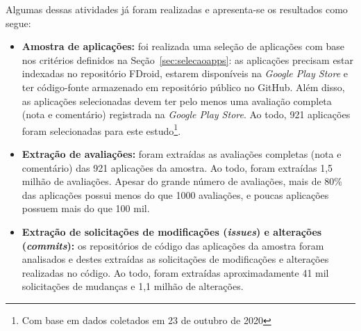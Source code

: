 Algumas dessas atividades já foram realizadas e apresenta-se os resultados como segue:
\begin{itemize}
 \item \textbf{Amostra de aplicações: } foi realizada uma seleção de aplicações com base nos critérios definidos na Seção~\ref{sec:selecaoapps}: as aplicações precisam estar indexadas no repositório FDroid, estarem disponíveis na \textit{Google Play Store} e ter código-fonte armazenado em repositório público no GitHub. Além disso, as aplicações selecionadas devem ter pelo menos uma avaliação completa (nota e comentário) registrada na \textit{Google Play Store}. Ao todo, 921 aplicações foram selecionadas para este estudo\footnote{Com base em dados coletados em 23 de outubro de 2020}.
 
 \item \textbf{Extração de avaliações: } foram extraídas as avaliações completas (nota e comentário) das 921 aplicações da amostra. Ao todo, foram extraídas 1,5 milhão de avaliações. Apesar do grande número de avaliações, mais de 80\% das aplicações possui menos do que 1000 avaliações, e poucas aplicações possuem mais do que 100 mil.
 
 \item \textbf{Extração de solicitações de modificações (\textit{issues}) e alterações (\textit{commits}): } os repositórios de código das aplicações da amostra foram analisados e destes extraídas as solicitações de modificações e alterações realizadas no código. Ao todo, foram extraídas aproximadamente 41 mil solicitações de mudanças e 1,1 milhão de alterações.

  
\end{itemize}



